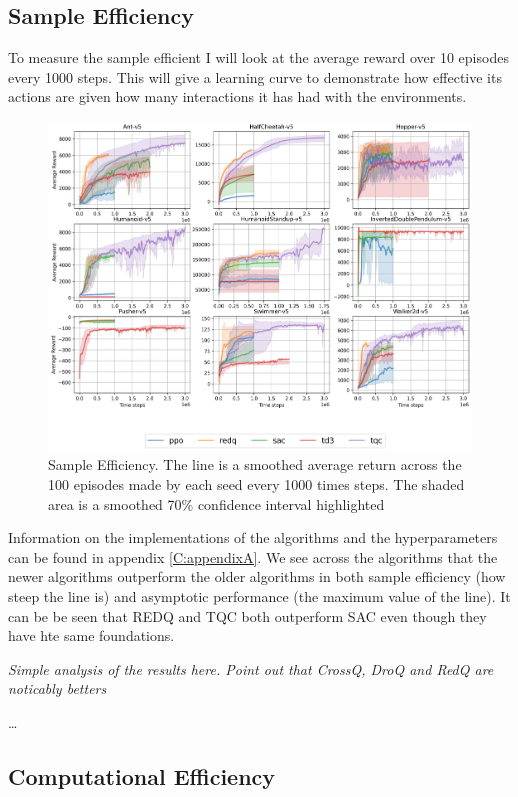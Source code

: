 \subsection{Sample Efficiency}
To measure the sample efficient I will look at the average reward over 10 episodes every 1000 steps. This will give a learning curve to demonstrate how effective its actions are given how many interactions it has had with the environments.

\begin{figure}[H]
    \centering
    \includegraphics[width=1\textwidth]{figures/baseline_results.png}
    \caption{Sample Efficiency. The line is a smoothed average return across the 100 episodes made by each seed every 1000 times steps. The shaded area is a smoothed 70\% confidence interval highlighted }
    \label{fig:sample_efficiency}
\end{figure}

Information on the implementations of the algorithms and the hyperparameters can be found in appendix \ref{C:appendixA}. We see across the algorithms that the newer algorithms outperform the older algorithms in both sample efficiency (how steep the line is) and asymptotic performance (the maximum value of the line). It can be be seen that REDQ and TQC both outperform SAC even though they have hte same foundations.

\textit{Simple analysis of the results here. Point out that CrossQ, DroQ and RedQ are noticably betters }

\dots

\subsection{Computational Efficiency}

